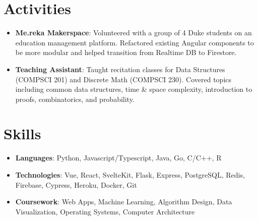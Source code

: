 \documentclass[letterpaper,10pt]{article}
\newcommand{\resumeItem}[2]{
  \item\small{
    \textbf{#1}{: #2 \vspace{-2pt}}
  }
}
\newcommand{\resumeSubItem}[2]{\resumeItem{#1}{#2}\vspace{-4pt}}
\newcommand{\resumeSubHeadingListStart}{\begin{itemize}[leftmargin=*]}
\newcommand{\resumeSubHeadingListEnd}{\end{itemize}}
\begin{document}
\section{Activities}
  \resumeSubHeadingListStart
    \resumeSubItem{Me.reka Makerspace}
      {Volunteered with a group of 4 Duke students on an education management platform. Refactored existing Angular components to be more modular and helped transition from Realtime DB to Firestore.}
    \resumeSubItem{Teaching Assistant}
      {Taught recitation classes for Data Structures (COMPSCI 201) and Discrete Math (COMPSCI 230). Covered topics including common data structures, time \& space complexity, introduction to proofs, combinatorics, and probability.}
  \resumeSubHeadingListEnd


 \section{Skills}
  \resumeSubHeadingListStart
    \resumeSubItem{Languages}{Python, Javascript/Typescript, Java, Go, C/C++, R}
    \resumeSubItem{Technologies}{Vue, React, SvelteKit, Flask, Express, PostgreSQL, Redis, Firebase, Cypress, Heroku, Docker, Git}
    \resumeSubItem{Coursework}{Web Apps, Machine Learning, Algorithm Design, Data Visualization, Operating Systems, Computer Architecture}
  \resumeSubHeadingListEnd


\end{document}

